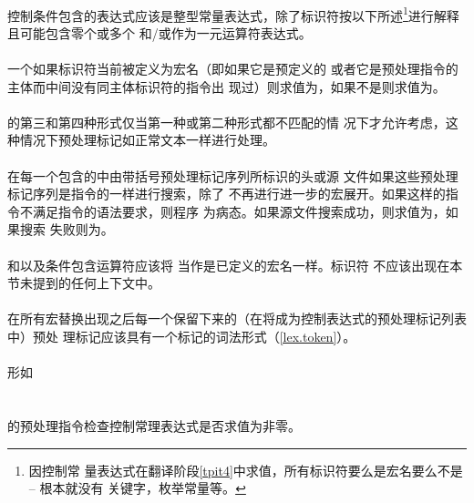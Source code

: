 \paragraph{}
控制条件包含的表达式应该是整型常量表达式，除了标识符按以下所述\footnote{因控制常
量表达式在翻译阶段\ref{tpit4}中求值，所有标识符要么是宏名要么不是 -- 根本就没有
关键字，枚举常量等。}进行解释且可能包含零个或多个
和/或作为一元运算符表达式。

\paragraph{}
一个如果标识符当前被定义为宏名（即如果它是预定义的
或者它是预处理指令的主体而中间没有同主体标识符的指令出
现过）则求值为，如果不是则求值为。

\paragraph{}
的第三和第四种形式仅当第一种或第二种形式都不匹配的情
况下才允许考虑，这种情况下预处理标记如正常文本一样进行处理。

\paragraph{}
在每一个包含的中由带括号预处理标记序列所标识的头或源
文件如果这些预处理标记序列是指令的一样进行搜索，除了
不再进行进一步的宏展开。如果这样的指令不满足指令的语法要求，则程序
为病态。如果源文件搜索成功，则求值为，如果搜索
失败则为。

\paragraph{}
和以及条件包含运算符应该将
当作是已定义的宏名一样。标识符
不应该出现在本节未提到的任何上下文中。

\paragraph{}
在所有宏替换出现之后每一个保留下来的（在将成为控制表达式的预处理标记列表中）预处
理标记应该具有一个标记的词法形式（\ref{lex.token}）。

\paragraph{}
形如                                                                          \\
\mbox{}                                                          \\
\mbox{}                                                          \\
的预处理指令检查控制常理表达式是否求值为非零。

